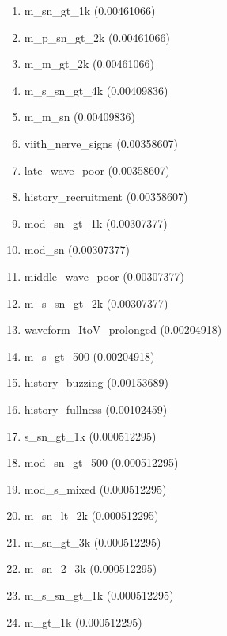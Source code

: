 \begin{enumerate}
\item m\_sn\_gt\_1k (0.00461066)
\item m\_p\_sn\_gt\_2k (0.00461066)
\item m\_m\_gt\_2k (0.00461066)
\item m\_s\_sn\_gt\_4k (0.00409836)
\item m\_m\_sn (0.00409836)
\item viith\_nerve\_signs (0.00358607)
\item late\_wave\_poor (0.00358607)
\item history\_recruitment (0.00358607)
\item mod\_sn\_gt\_1k (0.00307377)
\item mod\_sn (0.00307377)
\item middle\_wave\_poor (0.00307377)
\item m\_s\_sn\_gt\_2k (0.00307377)
\item waveform\_ItoV\_prolonged (0.00204918)
\item m\_s\_gt\_500 (0.00204918)
\item history\_buzzing (0.00153689)
\item history\_fullness (0.00102459)
\item s\_sn\_gt\_1k (0.000512295)
\item mod\_sn\_gt\_500 (0.000512295)
\item mod\_s\_mixed (0.000512295)
\item m\_sn\_lt\_2k (0.000512295)
\item m\_sn\_gt\_3k (0.000512295)
\item m\_sn\_2\_3k (0.000512295)
\item m\_s\_sn\_gt\_1k (0.000512295)
\item m\_gt\_1k (0.000512295)
\end{enumerate}
